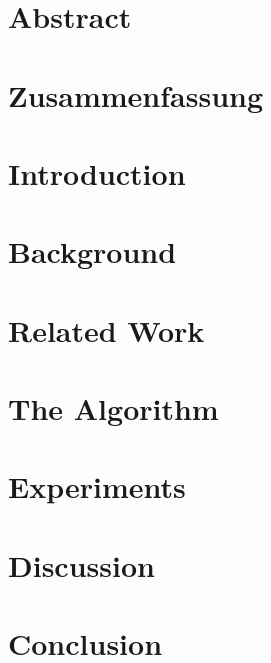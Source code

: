 \documentclass[12pt]{scrbook}
\begin{document}
\chapter*{Abstract}

%
\chapter*{Zusammenfassung}

%
\tableofcontents
%
%
\chapter{Introduction}
\label{introduction}

%
\chapter{Background}
\label{background}


\chapter{Related Work}
\label{related}

%
\chapter{The Algorithm}
\label{algorithm}

%
\chapter{Experiments}
\label{experiments}

%
\chapter{Discussion}
\label{discussion}

%
\chapter{Conclusion}

%
\printbibliography
%
%
\end{document}
